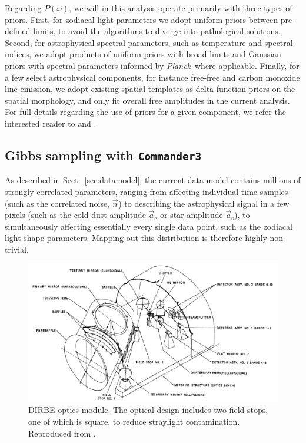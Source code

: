 \documentclass{aa}
\def\commanderthree{\texttt{Commander3}}
\def\Planck{\textit{Planck}}
\newcommand{\n}[0]{\vec{n}}
\renewcommand{\a}[0]{\vec{a}}
\begin{document}
Regarding $P(\omega)$, we will in this analysis operate primarily with
three types of priors. First, for zodiacal light parameters we adopt
uniform priors between pre-defined limits, to avoid the algorithms to
diverge into pathological solutions. Second, for
astrophysical spectral parameters, such as temperature and spectral
indices, we adopt products of uniform priors with broad limits and
Gaussian priors with spectral parameters informed by \Planck\ where
applicable. Finally, for a few select astrophysical components, for
instance free-free and carbon monoxide line emission, we adopt
existing spatial templates as delta function priors on the spatial
morphology, and only fit overall free amplitudes in the current
analysis. For full details regarding the use of priors for a given
component, we refer the interested reader to \citet{CG02_04} and \citet{CG02_05}.

\subsection{Gibbs sampling with \commanderthree}

As described in Sect.~\ref{sec:datamodel}, the current data model
contains millions of strongly correlated parameters, ranging from
affecting individual time samples (such as the correlated noise,
$\n_{\mathrm{}}$) to describing the astrophysical signal in a few
pixels (such as the cold dust amplitude $\a_{\mathrm{c}}$ or star
amplitude $\a_{\mathrm{s}}$), to simultaneously affecting
essentially every single data point, such as the zodiacal light shape
parameters. Mapping out this distribution is therefore highly
non-trivial.

\begin{figure}
	\centering
	\includegraphics[width=\linewidth]{figs/DIRBE_optics.png}
	\caption{DIRBE optics module. The optical design includes two field stops, one of which is square, to reduce straylight contamination. Reproduced from \cite{magner87}.
	}
	\label{fig:optics_model}
\end{figure}
\end{document}
